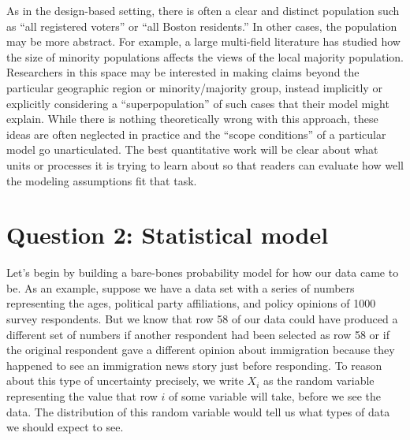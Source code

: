 \documentclass[
  13pt,
  letterpaper,
  DIV=11,
  numbers=noendperiod]{scrreprt}
\theoremstyle{plain}
\theoremstyle{definition}
\theoremstyle{definition}
\theoremstyle{remark}
\begin{document}
As in the design-based setting, there is often a clear and distinct
population such as ``all registered voters'' or ``all Boston
residents.'' In other cases, the population may be more abstract. For
example, a large multi-field literature has studied how the size of
minority populations affects the views of the local majority population.
Researchers in this space may be interested in making claims beyond the
particular geographic region or minority/majority group, instead
implicitly or explicitly considering a ``superpopulation'' of such cases
that their model might explain. While there is nothing theoretically
wrong with this approach, these ideas are often neglected in practice
and the ``scope conditions'' of a particular model go unarticulated. The
best quantitative work will be clear about what units or processes it is
trying to learn about so that readers can evaluate how well the modeling
assumptions fit that task.

\section{Question 2: Statistical
model}\label{question-2-statistical-model}

Let's begin by building a bare-bones probability model for how our data
came to be. As an example, suppose we have a data set with a series of
numbers representing the ages, political party affiliations, and policy
opinions of 1000 survey respondents. But we know that row 58 of our data
could have produced a different set of numbers if another respondent had
been selected as row 58 or if the original respondent gave a different
opinion about immigration because they happened to see an immigration
news story just before responding. To reason about this type of
uncertainty precisely, we write \(X_i\) as the random variable
representing the value that row \(i\) of some variable will take, before
we see the data. The distribution of this random variable would tell us
what types of data we should expect to see.
\end{document}

